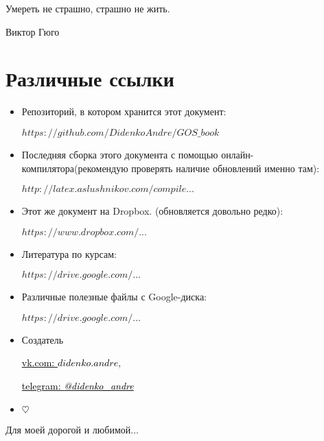 \epigraph{Умереть не страшно, страшно не жить.}{Виктор Гюго}

{\let\clearpage\relax\chapter{Различные ссылки}}
\begin{itemize}
\item

Репозиторий, в котором хранится этот документ:

\href{https://github.com/DidenkoAndre/GOS_book}{$https://github.com/DidenkoAndre/GOS\_book$}

\item
Последняя сборка этого документа с помощью онлайн-компилятора\newline (рекомендую проверять наличие обновлений именно там): 

\href{http://latex.aslushnikov.com/compile?git=https://github.com/DidenkoAndre/GOS_book&target=_main.tex}{$http://latex.aslushnikov.com/compile...$}

\item

Этот же документ на Dropbox.  \newline (обновляется довольно редко):

\href{https://www.dropbox.com/sh/7e5mfj8q68o2ipp/AAD8XvpZhiJzFbEh_IeH305ia?dl=0&preview=GOSBook.pdf}{$https://www.dropbox.com/...$}

\item
Литература по курсам:

\href{https://drive.google.com/drive/u/0/folders/0BzuzEyNkpwYDcENXcV9jNWdwVlU}{$https://drive.google.com/...$}

\item
Различные полезные файлы с Google-диска:

\href{https://drive.google.com/drive/u/0/folders/0BzuzEyNkpwYDYjVNcE0wa3hqWjA}{$https://drive.google.com/...$}

\item
Создатель

\href{https://vk.com/didenko.andre}{\textcolor{black}{vk.com: \textcolor{Purplemountainmajesty}{$didenko.andre$}}},

\href{https://telegram.me/didenko_andre}{\textcolor{black}{telegram: \textcolor{Purplemountainmajesty}{\textit{@didenko_andre}}}}

\item

$\heartsuit$
\end{itemize}

\newpage
\epigraph{Для моей дорогой и любимой...}{}